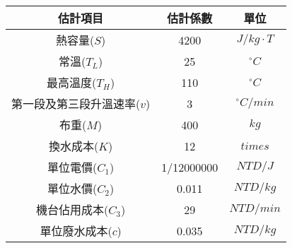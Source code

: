 \begin{tabular}{ccc}
\hline	
	\textbf{估計項目} & \textbf{估計係數} & \textbf{單位} \\ \hline \hline
	熱容量($S$) & 4200 & $J/{kg\cdot T}$ \\
	常溫($T_L$) & 25 & $^\circ C$ \\
	最高溫度($T_H$) & 110 & $^\circ C$ \\
	第一段及第三段升溫速率($v$) & 3 & $^\circ C/min$ \\
	布重($M$) & 400 & $kg$ \\
	換水成本($K$) & 12 & $times$ \\
	單位電價($C_{1}$) & 1/12000000 & $NTD/J$ \\
	單位水價($C_{2}$) & 0.011 & $NTD/kg$ \\ 
	機台佔用成本($C_{3}$) & 29 & $NTD/min$ \\
	單位廢水成本($c$) & 0.035 & $NTD/kg$ \\
\hline
\end{tabular}